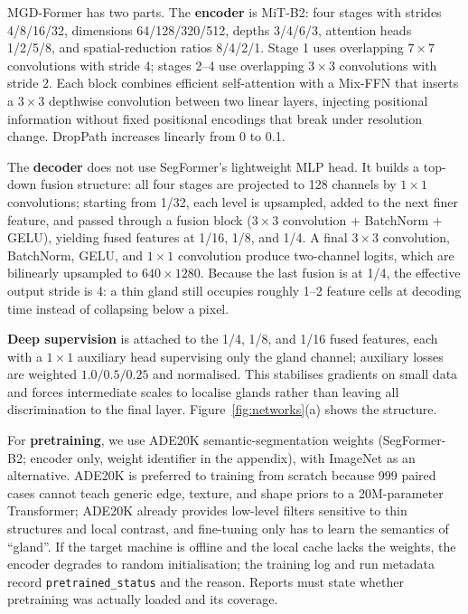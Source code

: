 MGD-Former has two parts. The \textbf{encoder} is MiT-B2\cite{segformer}: four stages with strides 4/8/16/32, dimensions 64/128/320/512, depths 3/4/6/3, attention heads 1/2/5/8, and spatial-reduction ratios 8/4/2/1. Stage 1 uses overlapping $7\times7$ convolutions with stride 4; stages 2--4 use overlapping $3\times3$ convolutions with stride 2. Each block combines efficient self-attention with a Mix-FFN that inserts a $3\times3$ depthwise convolution between two linear layers, injecting positional information without fixed positional encodings that break under resolution change. DropPath increases linearly from 0 to 0.1.

The \textbf{decoder} does not use SegFormer's lightweight MLP head. It builds a top-down fusion structure: all four stages are projected to 128 channels by $1\times1$ convolutions; starting from 1/32, each level is upsampled, added to the next finer feature, and passed through a fusion block ($3\times3$ convolution + BatchNorm + GELU), yielding fused features at 1/16, 1/8, and 1/4. A final $3\times3$ convolution, BatchNorm, GELU, and $1\times1$ convolution produce two-channel logits, which are bilinearly upsampled to $640\times1280$. Because the last fusion is at 1/4, the effective output stride is 4: a thin gland still occupies roughly 1--2 feature cells at decoding time instead of collapsing below a pixel.

\textbf{Deep supervision} is attached to the 1/4, 1/8, and 1/16 fused features, each with a $1\times1$ auxiliary head supervising only the gland channel; auxiliary losses are weighted $1.0/0.5/0.25$ and normalised. This stabilises gradients on small data and forces intermediate scales to localise glands rather than leaving all discrimination to the final layer. Figure~\ref{fig:networks}(a) shows the structure.

For \textbf{pretraining}, we use ADE20K semantic-segmentation weights (SegFormer-B2; encoder only, weight identifier in the appendix), with ImageNet as an alternative. ADE20K is preferred to training from scratch because 999 paired cases cannot teach generic edge, texture, and shape priors to a 20M-parameter Transformer; ADE20K already provides low-level filters sensitive to thin structures and local contrast, and fine-tuning only has to learn the semantics of ``gland''. If the target machine is offline and the local cache lacks the weights, the encoder degrades to random initialisation; the training log and run metadata record \texttt{pretrained\_status} and the reason. Reports must state whether pretraining was actually loaded and its coverage.

